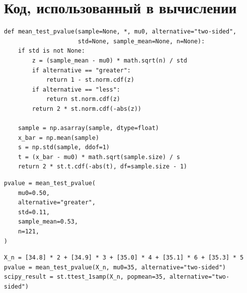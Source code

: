 \documentclass[a4paper,14pt]{extarticle}
\begin{document}
\section{Код, использованный в вычислении}

\begin{lstlisting}
def mean_test_pvalue(sample=None, *, mu0, alternative="two-sided",
                     std=None, sample_mean=None, n=None):
    if std is not None:
        z = (sample_mean - mu0) * math.sqrt(n) / std
        if alternative == "greater":
            return 1 - st.norm.cdf(z)
        if alternative == "less":
            return st.norm.cdf(z)
        return 2 * st.norm.cdf(-abs(z))

    sample = np.asarray(sample, dtype=float)
    x_bar = np.mean(sample)
    s = np.std(sample, ddof=1)
    t = (x_bar - mu0) * math.sqrt(sample.size) / s
    return 2 * st.t.cdf(-abs(t), df=sample.size - 1)
\end{lstlisting}

\begin{lstlisting}
pvalue = mean_test_pvalue(
    mu0=0.50,
    alternative="greater",
    std=0.11,
    sample_mean=0.53,
    n=121,
)
\end{lstlisting}

\begin{lstlisting}
X_n = [34.8] * 2 + [34.9] * 3 + [35.0] * 4 + [35.1] * 6 + [35.3] * 5
pvalue = mean_test_pvalue(X_n, mu0=35, alternative="two-sided")
scipy_result = st.ttest_1samp(X_n, popmean=35, alternative="two-sided")
\end{lstlisting}
\end{document}
